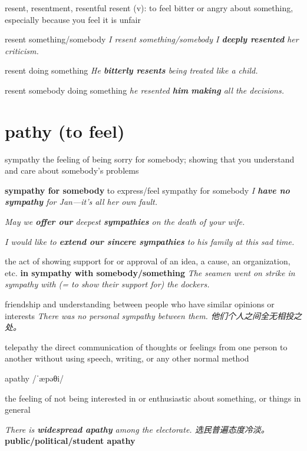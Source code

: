 \begin{RefWord}{resent, resentment, resentful}
    resent (v): to feel bitter or angry about something, especially because you feel it is unfair

    resent something/somebody
    \textit{I resent something/somebody I \textbf{deeply resented} her criticism.}

    resent doing something
    \textit{He \textbf{bitterly resents} being treated like a child.}

    resent somebody doing something
    \textit{he resented \textbf{him} \textbf{making} all the decisions.}
\end{RefWord}

\section{pathy (to feel)}

\begin{RefWord}{sympathy}
    the feeling of being sorry for somebody; showing that you understand and care about somebody’s problems

    \textbf{sympathy for somebody} to express/feel sympathy for somebody
    \textit{I \textbf{have no sympathy} for Jan—it's all her own fault.}

    \textit{May we \textbf{offer our} deepest \textbf{sympathies} on the death of your wife.}

    \textit{ I would like to \textbf{extend our sincere sympathies} to his family at this sad time.}

    the act of showing support for or approval of an idea, a cause, an organization, etc.
    \textbf{in sympathy with somebody/something} 
    \textit{The seamen went on strike in sympathy with (= to show their support for) the dockers.}

    friendship and understanding between people who have similar opinions or interests
    \textit{There was no personal sympathy between them. 他们个人之间全无相投之处。}
\end{RefWord}

\begin{DefWord}{telepathy}
    the direct communication of thoughts or feelings from one person to another without using speech, writing, or any other normal method
\end{DefWord}

\begin{DefWord}{apathy}
    /ˈæpəθi/

    the feeling of not being interested in or enthusiastic about something, or things in general

    \textit{There is \textbf{widespread apathy} among the electorate. 选民普遍态度冷淡。}
    \textbf{public/political/student apathy}
\end{DefWord}

